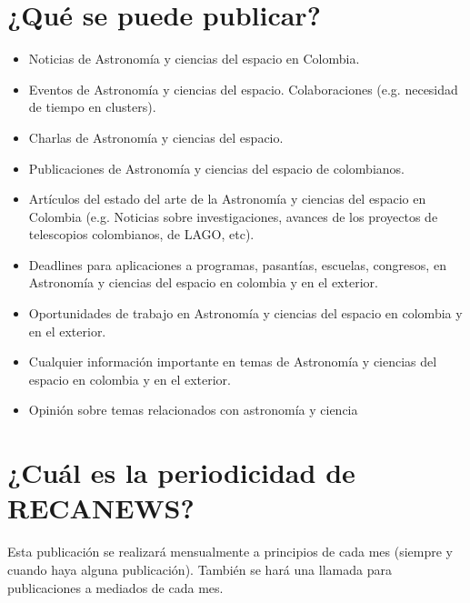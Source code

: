 \documentclass{book}
\begin{document}
\section*{¿Qué se puede publicar?}
\begin{itemize}
\item Noticias de Astronomía y ciencias del espacio en Colombia.
\item Eventos de Astronomía y ciencias del espacio.
Colaboraciones (e.g. necesidad de tiempo en clusters).
\item Charlas de Astronomía y ciencias del espacio.
\item Publicaciones de Astronomía y ciencias del espacio de colombianos.
\item Artículos del estado del arte de la Astronomía y ciencias del espacio en Colombia (e.g. Noticias sobre investigaciones, avances de los proyectos de telescopios colombianos, de LAGO, etc).
\item Deadlines para aplicaciones a programas, pasantías, escuelas, congresos, en Astronomía y ciencias del espacio  en colombia y en el exterior.
\item Oportunidades de trabajo en Astronomía y ciencias del espacio  en colombia y en el exterior.
\item Cualquier información importante en temas de Astronomía y ciencias del espacio  en colombia y en el exterior.
\item Opinión sobre temas relacionados con astronomía y ciencia
\end{itemize}


\section*{¿Cuál es la periodicidad de\\ RECANEWS?}

Esta publicación se realizará mensualmente a principios de cada mes (siempre y cuando haya alguna publicación). También se hará una llamada para publicaciones a mediados de cada mes. 


\end{document}
